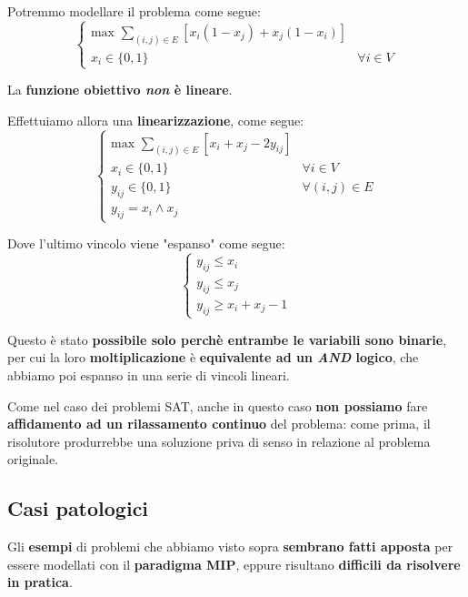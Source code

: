 Potremmo modellare il problema come segue:
\[
    \begin{cases}
        \text{max } \sum_{(i,j)\in E} \left[ x_i (1-x_j) + x_j(1-x_i) \right] \\ 
        x_i \in \{0,1\} & \forall i \in V  
    \end{cases}
\]

\begin{remark}
    La \textbf{funzione obiettivo \textit{non} è lineare}.
\end{remark}

Effettuiamo allora una \textbf{linearizzazione}, come segue:
\[
    \begin{cases}
        \text{max } \sum_{(i,j)\in E} \left[ x_i + x_j - 2y_{ij} \right] \\ 
        x_i \in \{0,1\} & \forall i \in V  \\ 
        y_{ij} \in \{0,1\} & \forall (i,j) \in E \\ 
        y_{ij} = x_i \land x_j
    \end{cases}
\]

Dove l'ultimo vincolo viene "espanso" come segue:
\[
    \begin{cases}
        y_{ij} \le x_i \\ 
        y_{ij} \le x_j \\ 
        y_{ij} \ge x_i + x_j -1
    \end{cases}
\]

\begin{remark}
    Questo è stato \textbf{possibile solo perchè entrambe le variabili sono binarie},
    per cui la loro \textbf{moltiplicazione} è \textbf{equivalente ad un \textit{AND} logico},
    che abbiamo poi espanso in una serie di vincoli lineari.
\end{remark}

\begin{remark}
    Come nel caso dei problemi SAT, anche in questo caso \textbf{non possiamo}
    fare \textbf{affidamento ad un rilassamento continuo} del problema: come
    prima, il risolutore produrrebbe una soluzione priva di senso in relazione
    al problema originale.
\end{remark}

\subsection{Casi patologici}

Gli \textbf{esempi} di problemi che abbiamo visto sopra
\textbf{sembrano fatti apposta} per essere modellati con il \textbf{paradigma MIP}, 
eppure risultano \textbf{difficili da risolvere in pratica}.

